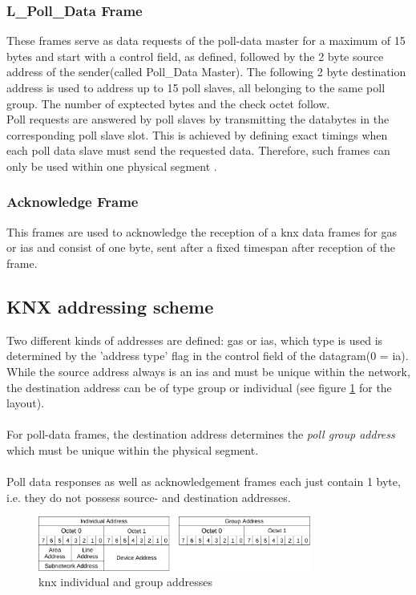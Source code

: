 \subsubsection{L\_Poll\_Data Frame}

These frames serve as data requests of the poll-data master for a maximum of 15 bytes
and start with a control field, as defined, followed by the 2 byte source address
of the sender(called Poll\_Data Master). The following 2 byte destination address is 
used to address up to 15 poll slaves, all belonging to the same poll group. The number of
exptected bytes and the check octet follow.
\\
Poll requests are answered by poll slaves by transmitting the databytes in the corresponding poll slave slot.
This is achieved by defining exact timings when each poll data slave must send the requested data. Therefore, such frames can only be used within
one physical segment \cite{knxTP1}.

\subsubsection{Acknowledge Frame}

This frames are used to acknowledge the reception of a knx data frames for \glspl{ga} or \glspl{ia} and consist
of one byte, sent after a fixed timespan after reception of the frame.

\subsection{KNX addressing scheme}

Two different kinds of addresses are defined: \glspl{ga} or \glspl{ia}, which type is used is determined by the 'address type' flag in the
control field of the datagram(0 = \gls{ia}). While the source address always is an \glspl{ia} and must be unique
within the network, the destination address can be of type group or individual (see figure \ref{fig:knxAddr} for the layout).
\\
\\
For poll-data frames, the destination address determines the \textit{poll group address} which must be unique within the physical segment.
\\
\\
Poll data responses as well as acknowledgement frames each just contain 1 byte, i.e. they do not possess source- and destination addresses.

\begin{figure}
 \centering
    \includegraphics[width=0.8\textwidth]{figures/addresses}
 \caption{\gls{knx} individual and group addresses} 
\label{fig:knxAddr}
\end{figure}


